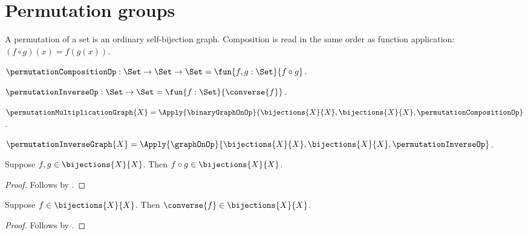 


\section{Permutation groups}

A permutation of a set is an ordinary self-bijection graph.  Composition is
read in the same order as function application:
$(f\circ g)(x)=f(g(x))$.

\begin{definition}\label{permutation_composition_op}
    $\permutationCompositionOp:\Set\to\Set\to\Set
        =\fun{f,g:\Set}{f\circ g}$.
\end{definition}

\begin{definition}\label{permutation_inverse_op}
    $\permutationInverseOp:\Set\to\Set
        =\fun{f:\Set}{\converse{f}}$.
\end{definition}

\begin{definition}\label{permutation_multiplication_graph}
    $\permutationMultiplicationGraph{X}=
        \Apply{\binaryGraphOnOp}{
            \bijections{X}{X},\bijections{X}{X},
            \permutationCompositionOp}$.
\end{definition}

\begin{definition}\label{permutation_inverse_graph}
    $\permutationInverseGraph{X}=
        \Apply{\graphOnOp}{
            \bijections{X}{X},\bijections{X}{X},
            \permutationInverseOp}$.
\end{definition}

\begin{proposition}\label{permutation_composition_closed}
    Suppose $f,g\in\bijections{X}{X}$.
    Then $f\circ g\in\bijections{X}{X}$.
\end{proposition}
\begin{proof}
    Follows by .
\end{proof}

\begin{proposition}\label{permutation_inverse_closed}
    Suppose $f\in\bijections{X}{X}$.
    Then $\converse{f}\in\bijections{X}{X}$.
\end{proposition}
\begin{proof}
    Follows by .
\end{proof}

